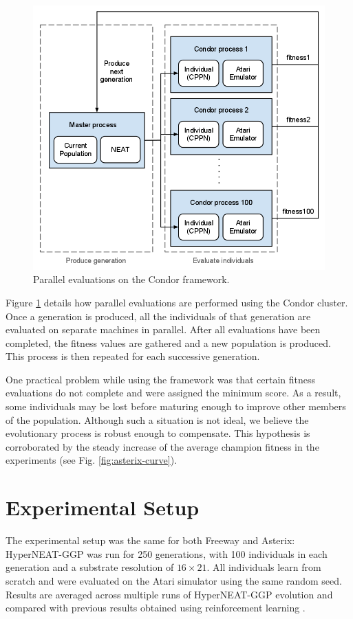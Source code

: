 \documentclass{sig-alternate}
\begin{document}
\begin{figure}[ht]
\begin{center}
\includegraphics[width=\columnwidth]{figures/condor-hyperneat-small}
\end{center}
\caption{Parallel evaluations on the Condor framework.}
\label{fig:condor}
\end{figure}

Figure \ref{fig:condor} details how parallel evaluations are performed using the Condor cluster. Once a generation is produced, all the individuals of that generation are evaluated on separate machines in parallel. After all evaluations have been completed, the fitness values are gathered and a new population is produced. This process is then repeated for each successive generation. 

One practical problem while using the framework was that certain fitness evaluations do not complete and were assigned the minimum score. As a result, some individuals may be lost before maturing enough to improve other members of the population. Although such a situation is not ideal, we believe the evolutionary process is robust enough to compensate. This hypothesis is corroborated by the steady increase of the average champion fitness in the experiments (see Fig. \ref{fig:asterix-curve}). 

\section{Experimental Setup}
\label{sec:experiments}
The experimental setup was the same for both Freeway and Asterix: HyperNEAT-GGP was run for 250 generations, with 100 individuals in each generation and a substrate resolution of $16\times 21$. All individuals learn from scratch and were evaluated on the Atari simulator using the same random seed. Results are averaged across multiple runs of HyperNEAT-GGP evolution and compared with previous results obtained using reinforcement learning \cite{naddaf10}. 
\end{document}
